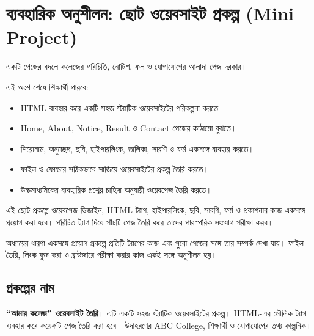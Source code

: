 \section{ব্যবহারিক অনুশীলন: ছোট ওয়েবসাইট প্রকল্প (Mini Project)}

একটি পেজের বদলে কলেজের পরিচিতি, নোটিশ, ফল ও যোগাযোগের আলাদা পেজ দরকার।



\begin{learningbox}
এই অংশ শেষে শিক্ষার্থী পারবে:
\begin{itemize}
\item HTML ব্যবহার করে একটি সহজ স্ট্যাটিক ওয়েবসাইটের পরিকল্পনা করতে।
\item Home, About, Notice, Result ও Contact পেজের কাঠামো বুঝতে।
\item শিরোনাম, অনুচ্ছেদ, ছবি, হাইপারলিংক, তালিকা, সারণি ও ফর্ম একসঙ্গে ব্যবহার করতে।
\item ফাইল ও ফোল্ডার সঠিকভাবে সাজিয়ে ওয়েবসাইটের প্রকল্প তৈরি করতে।
\item উচ্চমাধ্যমিকের ব্যবহারিক প্রশ্নের চাহিদা অনুযায়ী ওয়েবপেজ তৈরি করতে।
\end{itemize}
\end{learningbox}

এই ছোট প্রকল্পে ওয়েবপেজ ডিজাইন, HTML ট্যাগ, হাইপারলিংক, ছবি, সারণি, ফর্ম ও প্রকাশনার কাজ একসঙ্গে প্রয়োগ করা হবে। পরিচিত ট্যাগ দিয়ে পাঁচটি পেজ তৈরি করে তাদের পারস্পরিক সংযোগ পরীক্ষা করব।

\begin{keypointbox}{অধ্যায়ের ধারণা একসঙ্গে প্রয়োগ}
প্রকল্পে প্রতিটি ট্যাগের কাজ এবং পুরো পেজের সঙ্গে তার সম্পর্ক দেখা যায়। ফাইল তৈরি, লিংক যুক্ত করা ও ব্রাউজারে পরীক্ষা করার কাজ একই সঙ্গে অনুশীলন হয়।
\end{keypointbox}

\subsection{প্রকল্পের নাম}

\textbf{``আমার কলেজ'' ওয়েবসাইট তৈরি}। এটি একটি সহজ স্ট্যাটিক ওয়েবসাইটের প্রকল্প। HTML-এর মৌলিক ট্যাগ ব্যবহার করে কয়েকটি পেজ তৈরি করা হবে। উদাহরণের ABC College, শিক্ষার্থী ও যোগাযোগের তথ্য কাল্পনিক।

